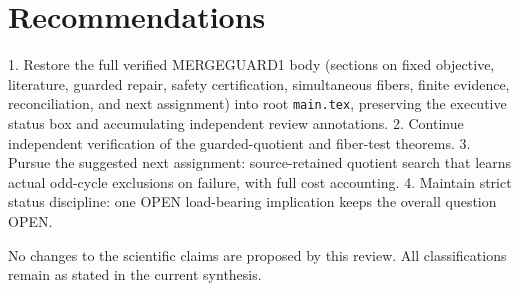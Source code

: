 \documentclass{article}
\begin{document}
\section{Recommendations}
1. Restore the full verified MERGEGUARD1 body (sections on fixed objective, literature, guarded repair, safety certification, simultaneous fibers, finite evidence, reconciliation, and next assignment) into root \texttt{main.tex}, preserving the executive status box and accumulating independent review annotations.
2. Continue independent verification of the guarded-quotient and fiber-test theorems.
3. Pursue the suggested next assignment: source-retained quotient search that learns actual odd-cycle exclusions on failure, with full cost accounting.
4. Maintain strict status discipline: one OPEN load-bearing implication keeps the overall question OPEN.

No changes to the scientific claims are proposed by this review. All classifications remain as stated in the current synthesis.
\end{document}
